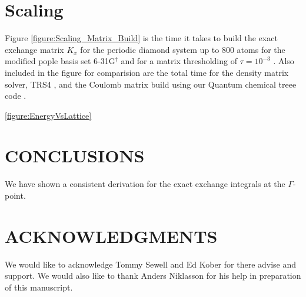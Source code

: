 \documentclass[prb,aps,nobibnotes,twocolumn,doublespace,twocolumngrid,superbib]{revtex4}
\begin{document}
\section{Scaling}
 
Figure \ref{figure:Scaling_Matrix_Build} is the time it takes to build the
exact exchange matrix  \( K_{x} \) for the periodic diamond system up to 800 atoms for the modified pople 
basis set 6-31G$ ^\dagger$ \cite{Pople92} and for a matrix thresholding of $\tau=10^{-3}$ .
Also included in the figure for comparision are the total time for the
density matrix solver, TRS4 \cite{ANiklasson03}, 
and the Coulomb matrix build using our Quantum chemical treee code \cite{CTymczak03c}. 



\ref{figure:EnergyVsLattice}


\section{CONCLUSIONS}
We have shown a consistent derivation for the exact exchange integrals at the $\Gamma$-point. 

\section*{ACKNOWLEDGMENTS}

We would like to acknowledge Tommy Sewell and Ed Kober for there advise
and support. We would also like to thank Anders Niklasson for his help
in preparation of this manuscript. 

 
 


\eject
\end{document}
